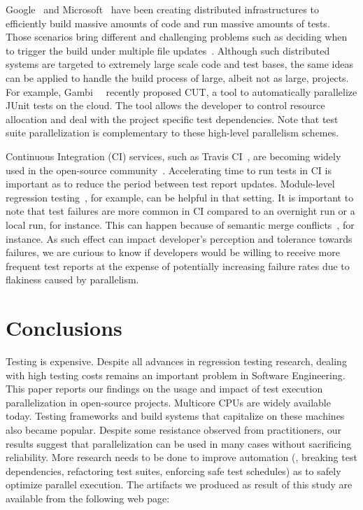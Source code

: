 \documentclass[10pt,journal,compsoc]{IEEEtran}
\begin{document}
Google~\cite{google-tap,google-ci} and
Microsoft~\cite{prasad-shulte-ieee-microsoft-ci} have been creating
distributed infrastructures to efficiently build massive amounts of
code and run massive amounts of tests.  Those scenarios bring
different and challenging problems such as deciding when to trigger
the build under multiple file
updates~\cite{memon-etal-icse17}. Although such distributed systems
are targeted to extremely large scale code and test bases, the same
ideas can be applied to handle the build process of large, albeit not
as large, projects.  For example,
Gambi~\etal{}~\cite{gambi-etal-issta2017} recently proposed CUT, a
tool to automatically parallelize JUnit tests on the cloud. The tool allows
the developer to control resource allocation and deal with the project
specific test dependencies.  Note that test suite parallelization is
complementary to these high-level parallelism schemes.

Continuous Integration (CI) services, such as Travis CI~\cite{travis},
are becoming widely used in the open-source
community~\cite{hilton-etal-ase2016,vasilescu-etal-fse2015}. Accelerating
time to run tests in CI is important as to reduce the period between
test report updates.  Module-level regression
testing~\cite{vasic-etal-fse2017}, for example, can be helpful in that
setting. It is important to note that test failures are more common in
CI compared to an overnight run or a local run, for instance.  This
can happen because of semantic merge conflicts~\cite{brun-etal-fse11},
for instance.  As such effect can impact developer's perception and
tolerance towards failures, we are curious to know if developers would
be willing to receive more frequent test reports at the expense of
potentially increasing failure rates due to flakiness caused by
parallelism.


\section{Conclusions}

Testing is expensive.  Despite all advances in regression testing
research, dealing with high testing costs remains an important problem
in Software Engineering.  This paper reports our findings on the usage
and impact of test execution parallelization in open-source projects.
Multicore CPUs are widely available today.  Testing frameworks and
build systems that capitalize on these machines also became popular.
Despite some resistance observed from practitioners, our results
suggest that parallelization can be used in many cases without
sacrificing reliability. More research needs to be done to improve
automation (\eg{}, breaking test dependencies, refactoring test
suites, enforcing safe test schedules) as to safely optimize parallel
execution.  The artifacts we produced as result of this study are
available from the following web page:
\end{document}
